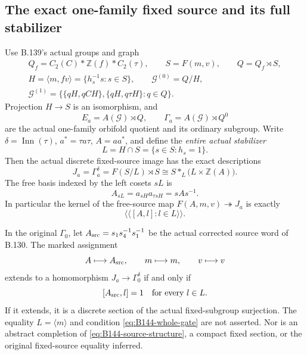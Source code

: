 \subsection*{The exact one-family fixed source and its full stabilizer}

\label{stmt:B144}
Use B.139's actual groups and graph
\[
 \begin{gathered}
 Q_f=C_2(C)*\mathbb Z(f)*C_2(\tau),\qquad S=F(m,v),\qquad
 Q=Q_f\rtimes S,\\
 H=\langle m,fv\rangle=\{h_s^{-1}s:s\in S\},\qquad
 \mathcal G^{(0)}=Q/H,\\
 \mathcal G^{(1)}=\bigl\{\{qH,qCH\},\{qH,q\tau H\}:q\in Q\bigr\}.
 \end{gathered}
\]
Projection $H\to S$ is an isomorphism, and
\[
 E_a=A(\mathcal G)\rtimes Q,
 \qquad\Gamma_a=A(\mathcal G)\rtimes Q^0
\]
are the actual one-family orbifold quotient and its ordinary subgroup.
Write $\delta=\operatorname{Inn}(\tau)$, $a^*=\tau a\tau$,
$A=aa^*$, and define the \emph{entire actual stabilizer}
\begin{equation}\label{eq:B144-stabilizer}
 L=H\cap S=\{s\in S:h_s=1\}.
\end{equation}
Then the actual discrete fixed-source image has the exact descriptions
\begin{equation}\label{eq:B144-source-structure}
 J_a=\Gamma_a^\delta
   =F(S/L)\rtimes S
   \cong S*_{L}\bigl(L\times\mathbb Z(A)\bigr).
\end{equation}
The free basis indexed by the left cosets $sL$ is
\begin{equation}\label{eq:B144-norm-basis}
 A_{sL}=a_{sH}a_{\tau sH}=sAs^{-1}.
\end{equation}
In particular the kernel of the free-source map
$F(A,m,v)\twoheadrightarrow J_a$ is exactly
\[
 \langle\!\langle[A,l]:l\in L\rangle\!\rangle.
\]

In the original $\Gamma_0$, let
$A_{\rm src}=s_1s_4^{-1}s_1^{-1}$ be the actual corrected source word
of B.130. The marked assignment
\begin{equation}\label{eq:B144-marked-section}
 A\longmapsto A_{\rm src},\qquad m\longmapsto m,
 \qquad v\longmapsto v
\end{equation}
extends to a homomorphism $J_a\to\Gamma_0^\delta$ if and only if
\begin{equation}\label{eq:B144-whole-gate}
 [A_{\rm src},l]=1\quad\text{for every }l\in L.
\end{equation}
If it extends, it is a discrete section of the actual fixed-subgroup
surjection. The equality $L=\langle m\rangle$ and condition
\eqref{eq:B144-whole-gate} are not asserted. Nor is an abstract
completion of \eqref{eq:B144-source-structure}, a compact fixed section,
or the original fixed-source equality inferred.


